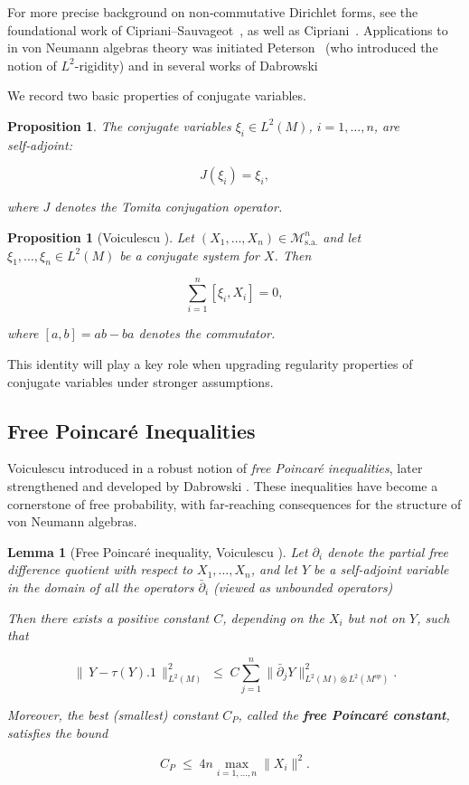 \documentclass[10pt,a4paper,reqno]{amsart}
\newtheorem{lemma}[theorem]{Lemma}
\newtheorem{proposition}[theorem]{Proposition}
\begin{document}
For more precise background on non‑commutative Dirichlet forms, see the foundational work of
Cipriani–Sauvageot~\cite{Sauvage,CiprianiSauvageot2003}, as well as
Cipriani~\cite{Cipriani}. Applications to in von Neumann algebras theory was initiated Peterson~\cite{Peterson} (who introduced the notion of $L^2$-rigidity) and in several works of Dabrowski~\cite{Dab10,DAB,Dab14} 

\medskip

We record two basic properties of conjugate variables.

\begin{proposition}\label{self}
The conjugate variables $\xi_i\in L^2(M)$, $i=1,\ldots,n$, are self‑adjoint:


\[
J(\xi_i)=\xi_i,
\]


where $J$ denotes the Tomita conjugation operator.
\end{proposition}

\begin{proposition}[Voiculescu \cite{V6}]\label{ab}
Let $(X_1,\ldots,X_n)\in\mathcal{M}^n_{\mathrm{s.a.}}$ and let
$\xi_1,\ldots,\xi_n\in L^2(M)$ be a conjugate system for $X$.  
Then


\[
\sum_{i=1}^n [\xi_i,X_i]=0,
\]


where $[a,b]=ab-ba$ denotes the commutator.
\end{proposition}

This identity will play a key role when upgrading regularity properties of
conjugate variables under stronger assumptions.

\subsection{Free Poincaré Inequalities}

Voiculescu introduced in \cite{Voipub} a robust notion of \emph{free Poincaré inequalities}, later strengthened and developed by Dabrowski \cite{Dab10}. These inequalities have become a cornerstone of free probability, with far-reaching consequences for the structure of von Neumann algebras.

\begin{lemma}[Free Poincaré inequality, Voiculescu \cite{Voipub}]
Let $\partial_i$ denote the partial free difference quotient with respect to $X_1,\ldots,X_n$, and let $Y$ be a self-adjoint variable in the domain of all the operators $\bar{\partial}_i$ (viewed as unbounded operators)


Then there exists a positive constant $C$, depending on the $X_i$ but not on $Y$, such that


\[
\big\|\, Y - \tau(Y).1\,\big\|_{L^2(M)}^2 \;\leq\; C \sum_{j=1}^n \big\| \bar{\partial}_j Y \big\|_{L^2(M){\bar\otimes} L^2(M^{op})}^2 .
\]


Moreover, the best (smallest) constant $C_P$, called the \textbf{free Poincaré constant}, satisfies the bound


\[
C_P \;\leq\; 4n\max_{i=1,\ldots,n}\lVert X_i\rVert^2.
\]


\end{lemma}
\end{document}
